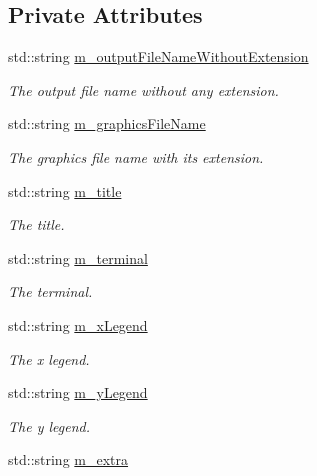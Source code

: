 \subsection*{Private Attributes}
\begin{DoxyCompactItemize}
\item 
std\+::string \hyperlink{classns3_1_1GnuplotAggregator_a3bfca1f816d054b5bb88438b9417c912}{m\+\_\+output\+File\+Name\+Without\+Extension}
\begin{DoxyCompactList}\small\item\em The output file name without any extension. \end{DoxyCompactList}\item 
std\+::string \hyperlink{classns3_1_1GnuplotAggregator_a1c71e8a1f4b1b2ff4d2802a257e26e2a}{m\+\_\+graphics\+File\+Name}
\begin{DoxyCompactList}\small\item\em The graphics file name with its extension. \end{DoxyCompactList}\item 
std\+::string \hyperlink{classns3_1_1GnuplotAggregator_a00cf8d3633f1f62bda0be5b5f1fa1f93}{m\+\_\+title}
\begin{DoxyCompactList}\small\item\em The title. \end{DoxyCompactList}\item 
std\+::string \hyperlink{classns3_1_1GnuplotAggregator_a658b78f6d45214fef0b2c3265585bab1}{m\+\_\+terminal}
\begin{DoxyCompactList}\small\item\em The terminal. \end{DoxyCompactList}\item 
std\+::string \hyperlink{classns3_1_1GnuplotAggregator_a68be1be101e20dfc199a7ddd48015fe7}{m\+\_\+x\+Legend}
\begin{DoxyCompactList}\small\item\em The x legend. \end{DoxyCompactList}\item 
std\+::string \hyperlink{classns3_1_1GnuplotAggregator_a3219ced94e278496e0b6cf69f251ad85}{m\+\_\+y\+Legend}
\begin{DoxyCompactList}\small\item\em The y legend. \end{DoxyCompactList}\item 
std\+::string \hyperlink{classns3_1_1GnuplotAggregator_a84892f8648179f98a31a9a1a5c641938}{m\+\_\+extra}
\item 

\end{DoxyCompactItemize}
